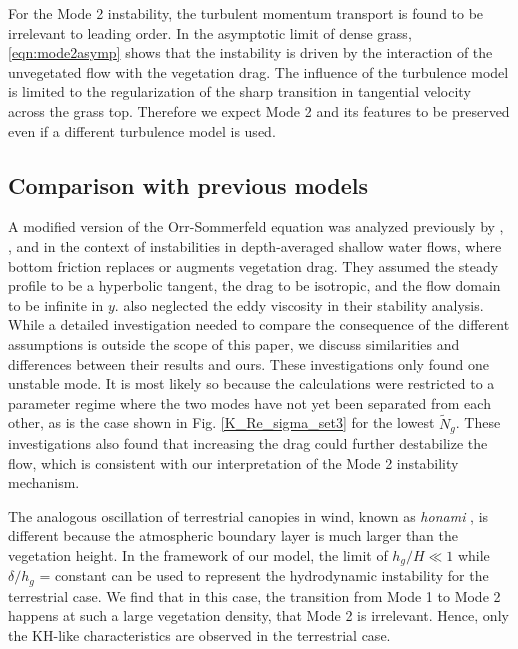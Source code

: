 \documentclass{jfm}
\newcommand{\hg}{h_g}
\newcommand{\Ndg}{\tilde{N}_g}
\begin{document}
For the Mode 2 instability, the turbulent momentum transport is found to be irrelevant to leading order.
In the asymptotic limit of dense grass, \eqref{eqn:mode2asymp} shows that the instability is driven by the interaction of the unvegetated flow with the vegetation drag.
The influence of the turbulence model is limited to the regularization of the sharp transition in tangential velocity across the grass top.
Therefore we expect Mode 2 and its features to be preserved even if a different turbulence model is used.

\subsection{Comparison with previous models}

A modified version of the Orr-Sommerfeld equation was analyzed previously by \cite{Chu91}, \cite{Chen97}, and \cite{White07} in the context of instabilities in depth-averaged shallow water flows, where bottom friction replaces or augments vegetation drag.
They assumed the steady profile to be a hyperbolic tangent, the drag to be isotropic, and the flow domain to be infinite in $y$.
\cite{White07} also neglected the eddy viscosity in their stability analysis.
While a detailed investigation needed to compare the consequence of the different assumptions is outside the scope of this paper, we discuss similarities and differences between their results and ours.
These investigations only found one unstable mode.
It is most likely so because the calculations were restricted to a parameter regime where the two modes have not yet been separated from each other, as is the case shown in Fig. \ref{K_Re_sigma_set3} for the lowest $\Ndg$.
These investigations also found that increasing the drag could further destabilize the flow, which is consistent with our interpretation of the Mode 2 instability mechanism.

The analogous oscillation of terrestrial canopies in wind, known as \textit{honami} \citep{Inoue56,Raupach96}, is different because the atmospheric boundary layer is much larger than the vegetation height.
In the framework of our model, the limit of $\hg/H \ll 1$ while $\delta/\hg$ = constant can be used to represent the hydrodynamic instability for the terrestrial case.
We find that in this case, the transition from Mode 1 to Mode 2 happens at such a large vegetation density, that Mode 2 is irrelevant. 
Hence, only the KH-like characteristics are observed in the terrestrial case. 
\end{document}
